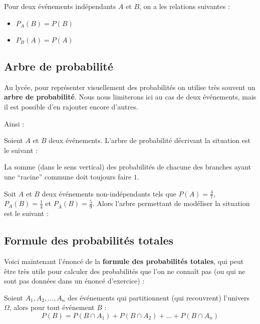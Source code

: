 	\begin{formula}[Propriétés]
		Pour deux événements indépendants $A$ et $B$, on a les relations suivantes :
		\begin{itemize}
			\item $P_{A}(B) = P(B)$
			\item $P_{B}(A) = P(A)$
		\end{itemize}
	\end{formula}

	\subsection{Arbre de probabilité}

	Au lycée, pour représenter visuellement des probabilités on utilise très souvent un \textbf{arbre de probabilité}. Nous nous limiterons ici au cas de deux événements, mais il est possible d'en rajouter encore d'autres.

	Ainsi :

	\begin{formula}[Définition]
		Soient $A$ et $B$ deux événements. L'arbre de probabilité décrivant la situation est le suivant :
	\end{formula}

	La somme (dans le sens vertical) des probabilités de chacune des branches ayant une ``racine'' commune doit toujours faire $1$.

	\begin{tip}[Exemple]
		Soit $A$ et $B$ deux événements non-indépendants tels que $P(A) = \frac{4}{7}$, $P_{A}(B) = \frac{1}{4}$ et $P_{\bar{A}}(B) = \frac{5}{9}$.
		\newline
		Alors l'arbre permettant de modéliser la situation est le suivant :
	\end{tip}

	\subsection{Formule des probabilités totales}

	Voici maintenant l'énoncé de la \textbf{formule des probabilités totales}, qui peut être très utile pour calculer des probabilités que l'on ne connaît pas (ou qui ne sont pas données dans un énoncé d'exercice) :

	\begin{formula}
		Soient $A_1, A_2, ..., A_n$ des événements qui partitionnent (qui recouvrent) l'univers $\Omega$, alors pour tout événement $B$ :
		\[ P(B) = P(B \cap A_1) + P(B \cap A_2) + \dots + P(B \cap A_n) \]
	\end{formula}

